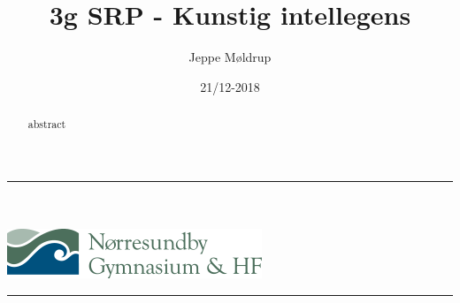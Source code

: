 \documentclass[12pt]{article}
\title{3g SRP - Kunstig intellegens}
\author{Jeppe Møldrup}
\affil{Nørresundby gymnasium og HF}
\date{21/12-2018}
\begin{document}
\begin{titlingpage}
\clearpage\maketitle
\thispagestyle{empty}
\noindent\rule{\textwidth}{0.4pt}\\
\\
\includegraphics[width=\textwidth]{pic/logo.png}
\noindent\rule{\textwidth}{0.4pt}
\pagebreak

\begin{abstract}
        abstract
\end{abstract}

\end{titlingpage}
\pagebreak

\tableofcontents
\pagebreak



\printbibliography
\end{document}
